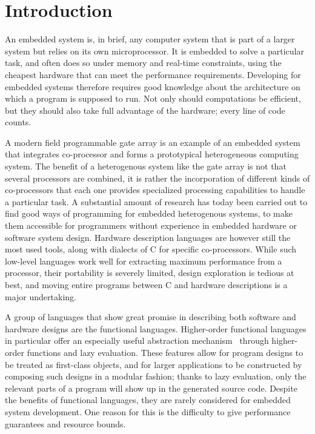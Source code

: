 \documentclass[../paper.tex]{subfiles}
\begin{document}
\chapter{Introduction}
\label{intro}

An embedded system is, in brief, any computer system that is part of a larger system but relies on its own microprocessor. It is embedded to solve a particular task, and often does so under memory and real-time constraints, using the cheapest hardware that can meet the performance requirements. Developing for embedded systems therefore requires good knowledge about the architecture on which a program is supposed to run. Not only should computations be efficient, but they should also take full advantage of the hardware; every line of code counts.

A modern field programmable gate array is an example of an embedded system that integrates co-processor and forms a prototypical heterogeneous computing system. The benefit of a heterogenous system like the gate array is not that several processors are combined, it is rather the incorporation of different kinds of co-processors that each one provides specialized processing capabilities to handle a particular task. A substantial amount of research has today been carried out to find good ways of programming for embedded heterogenous systems, to make them accessible for programmers without experience in embedded hardware or software system design. Hardware description languages are however still the most used tools, along with dialects of C for specific co-processors. While such low-level languages work well for extracting maximum performance from a processor, their portability is severely limited, design exploration is tedious at best, and moving entire programs between C and hardware descriptions is a major undertaking.

A group of languages that show great promise in describing both software and hardware designs are the functional languages. Higher-order functional languages in particular offer an especially useful abstraction mechanism~\cite{baaij2010, bjesse1998, gill2010} through higher-order functions and lazy evaluation. These features allow for program designs to be treated as first-class objects, and for larger applications to be constructed by composing such designs in a modular fashion; thanks to lazy evaluation, only the relevant parts of a program will show up in the generated source code. Despite the benefits of functional languages, they are rarely considered for embedded system development. One reason for this is the difficulty to give performance guarantees and resource bounds.
\end{document}
